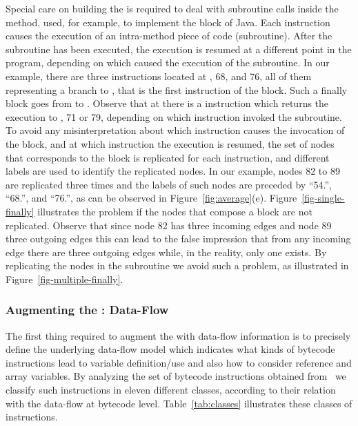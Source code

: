 Special care on building the \IG is required to deal with
subroutine calls inside the method, used, for example, to
implement the  block of Java. Each 
instruction causes the execution of an intra-method piece of code
(subroutine). After the subroutine has been executed, the
execution is resumed at a different point in the program,
depending on which  caused the execution of the
subroutine. In our example, there are three  instructions
located at , 68, and 76, all of them representing a branch
to , that is the first instruction of the 
block. Such a finally block goes from  to . Observe
that at  there is a  instruction which returns the
execution to , 71 or 79, depending on which 
instruction invoked the subroutine. To avoid any misinterpretation
about which  instruction causes the invocation of the
 block, and at which instruction the execution is
resumed, the set of nodes that corresponds to the 
block is replicated for each  instruction, and different
labels are used to identify the replicated nodes. In our example,
nodes 82 to 89 are replicated three times and the labels of such
nodes are preceded by ``54.'', ``68.'', and ``76.'', as can be
observed in Figure~\ref{fig:average}(e).
Figure~\ref{fig-single-finally} illustrates the problem if the
nodes that compose a  block are not replicated.
Observe that since node 82 has three incoming edges and node 89
three outgoing edges this can lead to the false impression that
from any incoming edge there are three outgoing edges while, in
the reality, only one exists. By replicating the nodes in the
subroutine we avoid such a problem, as illustrated in
Figure~\ref{fig-multiple-finally}.



\subsubsection{Augmenting the \IG: Data-Flow
\IG}\label{sec:data-info}

The first thing required to augment the \IG with data-flow
information is to precisely define the underlying data-flow model
which indicates what kinds of bytecode instructions lead to
variable definition/use and also how to consider reference and
array variables. By analyzing the set of bytecode instructions
obtained from~\cite{Lindholm99JVMS} we classify such instructions
in eleven different classes, according to their relation with the
data-flow at bytecode level. Table~\ref{tab:classes} illustrates
these classes of instructions.

